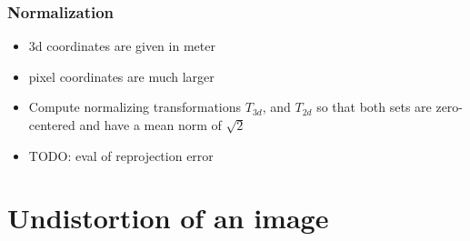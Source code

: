 \documentclass{beamer}
\begin{document}
\frame 
{
\frametitle{Normalization}
\begin{itemize}
\item 3d coordinates are given in meter 
\item pixel coordinates are much larger
\item Compute normalizing transformations $T_{3d}$, and $T_{2d}$ so that both sets are zero-centered and have a mean norm of $\sqrt{2}$
\item TODO: eval of reprojection error
\end{itemize}
}

\section{Undistortion of an image}

\end{document}
